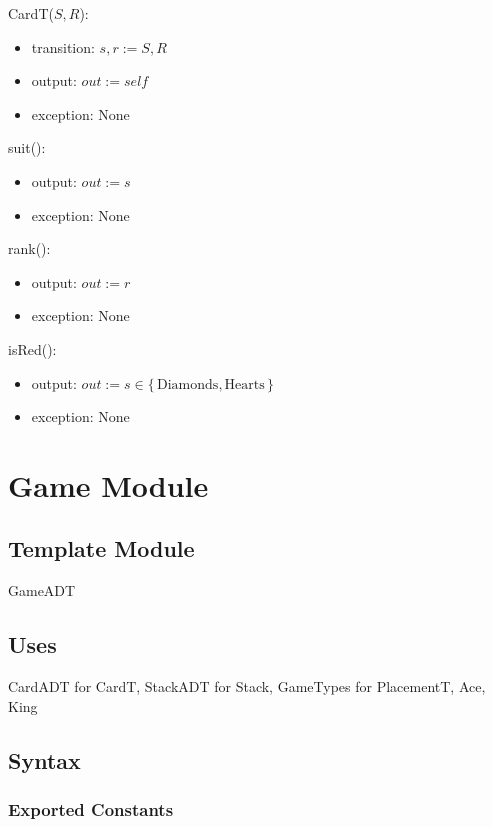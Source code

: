\documentclass[12pt]{article}
\newcommand{\set}[1]{{\{\, #1 \,\}}}
\begin{document}
CardT($S, R$):
\begin{itemize}
    \item transition: $s, r := S, R$
    \item output: $out := \mathit{self}$
    \item exception: None
\end{itemize}

\noindent suit():
\begin{itemize}
    \item output: $out := s$
    \item exception: None
\end{itemize}

\noindent rank():
\begin{itemize}
    \item output: $out := r$
    \item exception: None
\end{itemize}

\noindent isRed():
\begin{itemize}
    \item output: $out := s \in \set{\mbox{Diamonds}, \mbox{Hearts}}$
    \item exception: None
\end{itemize}


\newpage


\section*{Game Module}

\subsection*{Template Module}

GameADT

\subsection*{Uses}

CardADT for CardT, StackADT for Stack,
GameTypes for PlacementT, Ace, King

\subsection*{Syntax}

\subsubsection*{Exported Constants}
\end{document}
